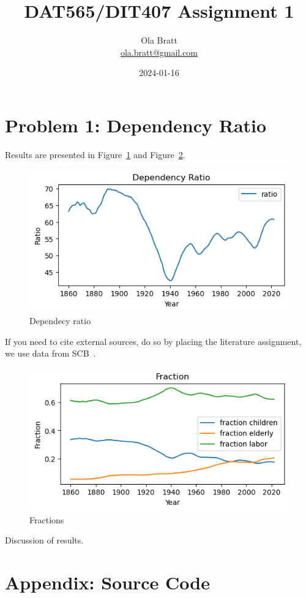 \documentclass[a4paper]{article}
\begin{document}
\author{Ola Bratt \\
  \href{mailto:ola.bratt@gmail.com}{ola.bratt@gmail.com}
}
\title{DAT565/DIT407 Assignment 1}
\date{2024-01-16}

\maketitle



\section*{Problem 1: Dependency Ratio}

Results are presented in Figure~\ref{fig:ratio} and
Figure~\ref{fig:fractions}.



\begin{figure}[h]
  \begin{center}
    \includegraphics[width=\textwidth]{ratio.png}
    \caption{Dependecy ratio}
    \label{fig:ratio}
  \end{center}
\end{figure}

\newpage
If you need to cite external sources, do so by placing the literature
assignment, we use data from SCB~\cite{SCB:2023}.

\begin{figure}[h]
  \begin{center}
    \includegraphics[width=\textwidth]{fractions.png}
    \caption{Fractions}
    \label{fig:fractions}
  \end{center}
\end{figure}


Discussion of results.

\printbibliography

\section*{Appendix: Source Code}

\end{document}
